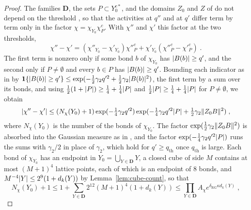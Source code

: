 \documentclass[11pt]{preprint}
\DeclarePairedDelimiter{\abs}{\lvert}{\rvert}
\DeclarePairedDelimiter{\norm}{\lVert}{\rVert}
\numberwithin{equation}{section}
\theoremstyle{definition}
\theoremstyle{remark}
\theoremstyle{plain}
\begin{document}
\begin{proof}
The families $\mathbf D$, the sets $P \subset Y_0^{c*}$, and the domains $Z_0$ and $Z$ of \cite[(2.1)--(2.13)]{BalabanRG2} do not depend on the threshold \cite[(2.1)--(2.3), p.~12]{BalabanRG2}, so that the activities at $q''$ and at $q'$ differ term by term only in the factor $\chi = \chi_{Y_0}\chi^c_P$. With $\chi''$ and $\chi'$ this factor at the two thresholds,
\begin{equation}\label{eq:cutoff-difference}
    \chi'' - \chi' = (\chi''_{Y_0} - \chi'_{Y_0})\chi''^c_P + \chi'_{Y_0}(\chi''^c_P - \chi'^c_P)\;.
\end{equation}
The first term is nonzero only if some bond $b$ of $\chi_{Y_0}$ has $\abs{B(b)} \geq q'$, and the second only if $P \neq \emptyset$ and every $b \in P$ has $\abs{B(b)} \geq q'$. Bounding each indicator as in \cite[(2.22)]{BalabanRG2} by $\mathbf 1\{ \abs{B(b)} \geq q' \} \leq \exp(-\frac12\gamma_2q'^2 + \frac12\gamma_2\abs{B(b)}^2)$, the first term by a sum over its bonds, and using $\frac12(1 + \abs{P}) \geq \frac14 + \frac14\abs{P}$ and $\frac12\abs{P} \geq \frac14 + \frac14\abs{P}$ for $P \neq \emptyset$, we obtain
\begin{equation}\label{eq:cutoff-difference-bound}
    \abs{\chi'' - \chi'} \leq (N_\chi(Y_0) + 1)\exp(-\tfrac14\gamma_2q'^2)\exp(-\tfrac14\gamma_2q'^2\abs{P} + \tfrac12\gamma_2\norm{Z_0B}^2)\;,
\end{equation}
where $N_\chi(Y_0)$ is the number of the bonds of $\chi_{Y_0}$. The factor $\exp(\frac12\gamma_2\norm{Z_0B}^2)$ is absorbed into the Gaussian measure as in \cite[(2.23), p.~16]{BalabanRG2}, and the factor $\exp(-\frac14\gamma_2q'^2\abs{P})$ runs the sums \cite[(2.31)--(2.34)]{BalabanRG2} with $\gamma_2/2$ in place of $\gamma_2$, which hold for $q' \geq q_{\mathrm{th}}$ once $q_{\mathrm{th}}$ is large. Each bond of $\chi_{Y_0}$ has an endpoint in $Y_0 = \bigcup_{Y \in \mathbf D}Y$, a closed cube of side $M$ contains at most $(M + 1)^4$ lattice points, each of which is an endpoint of $8$ bonds, and $M^{-4}\abs{Y} \leq 2^9(1 + d_k(Y))$ by Lemma~\ref{lem:cube-count}, so that
\begin{equation}\label{eq:bond-count}
    N_\chi(Y_0) + 1 \leq 1 + \sum_{Y \in \mathbf D}2^{12}(M + 1)^4(1 + d_k(Y)) \leq \prod_{Y \in \mathbf D}A_\chi e^{\delta_{\mathrm{RG}}\kappa d_k(Y)}\;,
\end{equation}

\end{proof}
\end{document}
